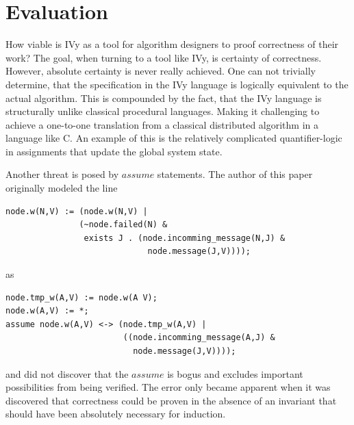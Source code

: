 \documentclass[fleqn]{article}
\begin{document}
\section{Evaluation}


How viable is IVy as a tool for algorithm designers to proof correctness
of their work?  The goal, when turning to a tool like IVy, is certainty of
correctness. However, absolute certainty is never really achieved.
One can not trivially determine, that the specification in the IVy language is logically equivalent to the actual algorithm.
This is compounded by the fact, that the IVy language is structurally unlike classical procedural languages. Making it challenging to achieve
a one-to-one translation from a classical distributed algorithm in a language like C. An example of this is
the relatively complicated quantifier-logic in assignments that update the global system state.

Another threat is posed by $assume$ statements. The author of this paper originally modeled the line

\begin{mdframed}[backgroundcolor=light-gray, roundcorner=10pt,leftmargin=1, rightmargin=1, innerleftmargin=15, innertopmargin=15,innerbottommargin=15, outerlinewidth=1, linecolor=light-gray]
\begin{lstlisting}
node.w(N,V) := (node.w(N,V) |
               (~node.failed(N) &
                exists J . (node.incomming_message(N,J) &
                             node.message(J,V))));
\end{lstlisting}
\end{mdframed}

as

\begin{mdframed}[backgroundcolor=light-gray, roundcorner=10pt,leftmargin=1, rightmargin=1, innerleftmargin=15, innertopmargin=15,innerbottommargin=15, outerlinewidth=1, linecolor=light-gray]
\begin{lstlisting}
node.tmp_w(A,V) := node.w(A V);
node.w(A,V) := *;
assume node.w(A,V) <-> (node.tmp_w(A,V) |
                        ((node.incomming_message(A,J) &
                          node.message(J,V))));
\end{lstlisting}
\end{mdframed}
 and did not discover that the $assume$ is bogus and excludes important possibilities from being verified.
 The error only became apparent when it was discovered that correctness could be proven in the absence of an invariant that should have been absolutely necessary for induction.
\end{document}
